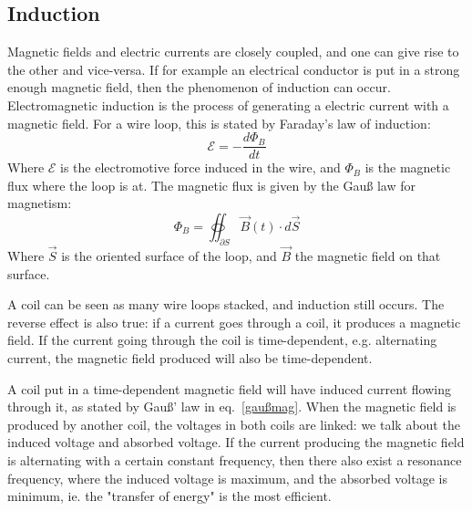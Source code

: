 \documentclass{scrartcl}
\begin{document}
\subsection{Induction}
Magnetic fields and electric currents are closely coupled, and one can give rise to the other and vice-versa. If for example an electrical conductor is put in a strong enough magnetic field, then the phenomenon of induction can occur. Electromagnetic induction is the process of generating a electric current with a magnetic field. For a wire loop, this is stated by Faraday's law of induction: \begin{equation}
    \mathcal{E} = - \frac{d \Phi_B}{dt}
    \label{gaußmag}
\end{equation} Where $\mathcal{E}$ is the electromotive force induced in the wire, and $\Phi_B$ is the magnetic flux where the loop is at. The magnetic flux is given by the Gauß law for magnetism: \begin{equation}
    \Phi_B = \oiint_{\partial S} \Vec{B}(t) \cdot d\Vec{S} 
\end{equation} Where $\Vec{S}$ is the oriented surface of the loop, and $\Vec{B}$ the magnetic field on that surface.

A coil can be seen as many wire loops stacked, and induction still occurs. The reverse effect is also true: if a current goes through a coil, it produces a magnetic field. If the current going through the coil is time-dependent, e.g. alternating current, the magnetic field produced will also be time-dependent. 

A coil put in a time-dependent magnetic field will have induced current flowing through it, as stated by Gauß' law in eq.~\ref{gaußmag}. When the magnetic field is produced by another coil, the voltages in both coils are linked: we talk about the induced voltage and absorbed voltage. If the current producing the magnetic field is alternating with a certain constant frequency, then there also exist a resonance frequency, where the induced voltage is maximum, and the absorbed voltage is minimum, ie. the "transfer of energy" is the most efficient.
\end{document}

